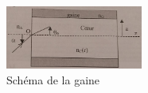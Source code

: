 \documentclass{article}
\begin{document}
\begin{figure}[h!]
  \centering
  \includegraphics[width=0.4\textwidth]{exercice 3.jpg}
    \caption{Schéma de la gaine}
\end{figure}
\end{document}

